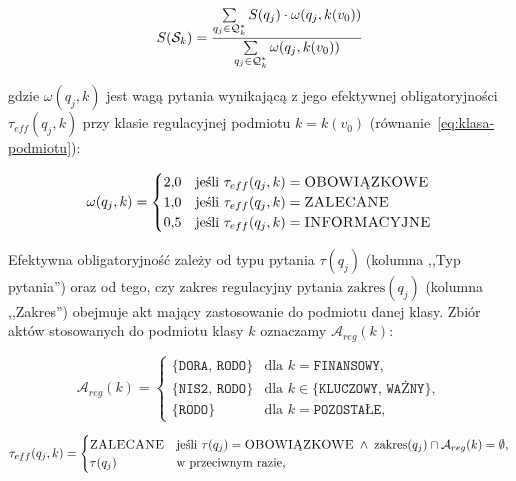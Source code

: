 \begin{equation}
S(\mathcal{S}_k) =
\frac{%
  \sum\limits_{q_j \in \mathcal{Q}^{*}_k} S(q_j) \cdot \omega(q_j, k(v_0))%
}{%
  \sum\limits_{q_j \in \mathcal{Q}^{*}_k} \omega(q_j, k(v_0))%
}
\label{eq:wynik-sekcji-avg}
\end{equation}


\noindent gdzie $\omega(q_j, k)$ jest wagą pytania
wynikającą z jego efektywnej obligatoryjności
$\tau_{eff}(q_j, k)$ przy klasie regulacyjnej podmiotu $k = k(v_0)$
(równanie~\eqref{eq:klasa-podmiotu}):

\begin{equation}
\omega(q_j, k) =
\begin{cases}
2{,}0 & \text{jeśli } \tau_{eff}(q_j, k) = \textsc{OBOWIĄZKOWE} \\
1{,}0 & \text{jeśli } \tau_{eff}(q_j, k) = \textsc{ZALECANE} \\
0{,}5 & \text{jeśli } \tau_{eff}(q_j, k) = \textsc{INFORMACYJNE}
\end{cases}
\label{eq:omega}
\end{equation}

\noindent Efektywna obligatoryjność zależy od typu pytania
$\tau(q_j)$ (kolumna ,,Typ pytania'') oraz od tego, czy zakres
regulacyjny pytania $\mathrm{zakres}(q_j)$ (kolumna ,,Zakres'')
obejmuje akt mający zastosowanie do podmiotu danej klasy.
Zbiór aktów stosowanych do podmiotu klasy $k$ oznaczamy $\mathcal{A}_{reg}(k)$:

\begin{equation}
\mathcal{A}_{reg}(k) =
\begin{cases}
\{\texttt{DORA},\, \texttt{RODO}\} & \text{dla } k = \texttt{FINANSOWY}, \\
\{\texttt{NIS2},\, \texttt{RODO}\} & \text{dla } k \in \{\texttt{KLUCZOWY},\, \texttt{WAŻNY}\}, \\
\{\texttt{RODO}\} & \text{dla } k = \texttt{POZOSTAŁE},
\end{cases}
\label{eq:akty-klasy}
\end{equation}

\begin{equation}
\tau_{eff}(q_j, k) =
\begin{cases}
\textsc{ZALECANE} &
  \text{jeśli } \tau(q_j) = \textsc{OBOWIĄZKOWE}
  \;\wedge\; \mathrm{zakres}(q_j) \cap \mathcal{A}_{reg}(k) = \emptyset, \\
\tau(q_j) & \text{w~przeciwnym razie,}
\end{cases}
\label{eq:tau-eff}
\end{equation}

